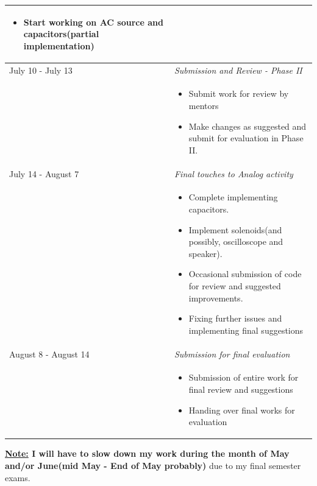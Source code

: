 \documentclass[preprint,12pt]{elsarticle}
\begin{document}
\begin{center}
\begin{tabularx}{\linewidth}{|l|X|}
{\begin{itemize}[noitemsep, topsep=2pt]
	\begin{itemize}
		\item Start working on AC source and capacitors(partial implementation)
	\end{itemize}
\end{itemize}
}\\
\hline\hline

{July 10  - July 13} & {\textit{Submission and Review - Phase II
}}\\
\hline

 & \par
\parbox{12cm}{
\begin{itemize}[noitemsep, topsep=2pt]
	\item Submit work for review by mentors
	\item Make changes as suggested and submit for evaluation in Phase II.
\end{itemize}
}\\
\hline\hline

{July 14 - August 7} & {\textit{Final touches to Analog activity
}}\\
\hline

 & \par
\parbox{12cm}{
\begin{itemize}[noitemsep, topsep=2pt]
	\item Complete implementing capacitors.
	\item Implement solenoids(and possibly, oscilloscope and speaker).
	\item Occasional submission of code for review and suggested improvements.
	\item Fixing further issues and implementing final suggestions
\end{itemize}
}\\
\hline\hline

{August 8 - August 14} & {\textit{Submission for final evaluation
}}\\
\hline

 & \par
\parbox{12cm}{
\begin{itemize}[noitemsep, topsep=2pt]
	\item Submission of entire work for final review and suggestions
	\item Handing over final works for evaluation
\end{itemize}
}\\
\hline\hline

\end{tabularx}
\end{center}
\textbf{\underline{Note:} I will have to slow down my work during the month of May and/or June(mid May - End of May probably)} due to my final semester exams.
\bigskip\bigskip\bigskip\bigskip
\end{document}
